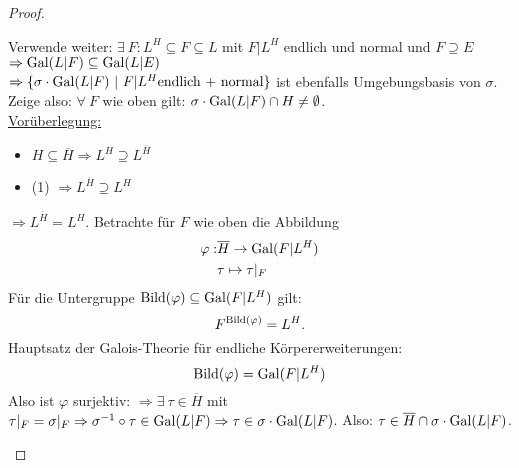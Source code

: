 \begin{proof}
\begin{enumerate}[(1)]
Verwende weiter: $\exists \ F: L^H \subseteq F \subseteq L$ mit $F|L^H$ endlich und normal und $F \supseteq E$\\
$\Rightarrow \operatorname{Gal}(L|F) \subseteq \operatorname{Gal}(L|E)$\\
$\Rightarrow \{\sigma \cdot \Gal(L|F) \ | \ F|L^H \text{endlich + normal}\}$ ist ebenfalls Umgebungsbasis von $\sigma$.\\
Zeige also: $\forall \ F$ wie oben gilt: $\sigma \cdot \operatorname{Gal}(L|F) \cap H \neq \emptyset$.\\
\underline{Vorüberlegung:} \begin{itemize}
\item $H \subseteq \overline{H} \Rightarrow L^H \supseteq L^{\overline{H}}$
\item (1) $\Rightarrow L^{\overline{H}} \supseteq L^H$
\end{itemize}
$\Rightarrow L^{\overline{H}}=L^H.$
Betrachte für $F$ wie oben die Abbildung
\begin{align*}
\varphi: &\overline{H} \to \operatorname{Gal}(F|L^H)\\
&\tau \mapsto \tau|_F
\end{align*}
Für die Untergruppe $\operatorname{Bild}(\varphi) \subseteq \operatorname{Gal}(F |L^H)$ gilt:
\[F^{\operatorname{Bild}(\varphi)} = L^H.\]
Hauptsatz der Galois-Theorie für endliche Körpererweiterungen:
\[\operatorname{Bild}(\varphi)=\operatorname{Gal}(F|L^H)\]
Also ist $\varphi$ surjektiv: $\Rightarrow \exists \ \tau \in \overline{H}$ mit $\tau|_F = \sigma|_F \Rightarrow \sigma^{-1}\circ \tau \in \operatorname{Gal}(L|F) \Rightarrow \tau \in \sigma \cdot \operatorname{Gal}(L|F)$. Also: $\tau \in \overline{H} \cap \sigma \cdot \operatorname{Gal}(L|F)$.
\end{enumerate}
\end{proof}